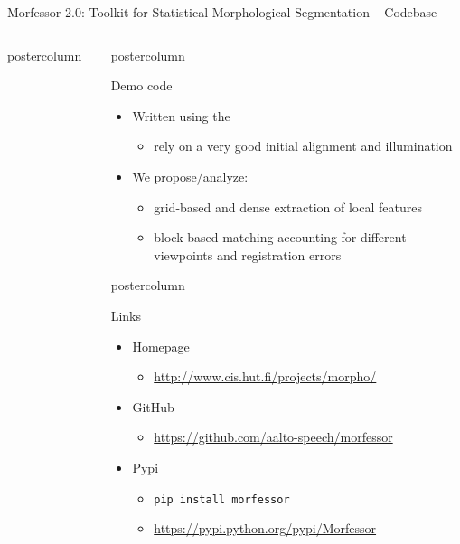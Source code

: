 \documentclass[final]{beamer} %
\begin{document}
\begin{frame}{Morfessor 2.0: Toolkit for Statistical Morphological Segmentation -- Codebase}
\begin{columns}
\begin{column}{.3\textwidth}
\begin{beamercolorbox}[center,wd=\textwidth]{postercolumn}
	\end{beamercolorbox}
\end{column}
\begin{column}{.3\textwidth}
  \begin{beamercolorbox}[center,wd=\textwidth]{postercolumn}
 \begin{block}{Demo code}
              \begin{itemize}
              \item Written using the 
                \begin{itemize}
                \item rely on a very good initial alignment and illumination
                \end{itemize}
              \item We propose/analyze:
                \begin{itemize}
                \item grid-based and dense extraction of local features
                \item block-based matching accounting for different\\
	                  viewpoints and registration errors
                \end{itemize}
              \end{itemize}              
            \end{block}
            
	\end{beamercolorbox}



	  \begin{beamercolorbox}[center,wd=\textwidth]{postercolumn}
	 \begin{block}{Links}
	              \begin{itemize}
			\item Homepage
	                \begin{itemize}
	                \item \url{http://www.cis.hut.fi/projects/morpho/}
	                \end{itemize}
	\item GitHub
	                \begin{itemize}
	                \item \url{https://github.com/aalto-speech/morfessor} 
	                \end{itemize}

	              \item Pypi
	                \begin{itemize}
	                \item \texttt{pip install morfessor}
\item \url{https://pypi.python.org/pypi/Morfessor} 
	                \end{itemize}


\end{itemize}
\end{block}
\end{beamercolorbox}
\end{column}
\end{columns}
\end{frame}
\end{document}
